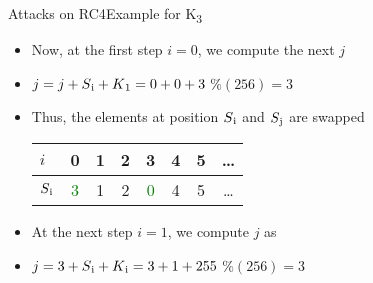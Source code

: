 \documentclass[
	aspectratio=169,	%
	onlytextwidth,		%
	t,					%
	]{beamer}
\begin{document}
\begin{frame}[fragile]{Attacks on RC4}{Example for K\textsubscript{3}}
	\begin{itemize}
		\item Now, at the first step $i=0$, we compute the next $j$
		\item $j = j + S\textsubscript{i} + K\textsubscript{1} = 0 + 0 + 3$ $\% (256) = 3$
		\item Thus, the elements at position $S\textsubscript{i}$ and $S\textsubscript{j}$ are swapped
		\medskip
		\begin{table}[h!]
			\begin{center}
			  \begin{tabular}{l|c|c|c|c|c|c|c}
				$i$ & 0 & 1 & 2 & 3 & 4 & 5 & \dots\\
				\hline
				$S\textsubscript{i}$ & \textcolor{green}{3} & 1 & 2 & \textcolor{green}{0} & 4 & 5 & \dots\\
			  \end{tabular}
			\end{center}
		  \end{table}
		\item At the next step $i = 1$, we compute $j$ as
		\item $j = 3 + S\textsubscript{i} + K\textsubscript{i} = 3 + 1 + 255$ $\% (256) = 3$
	\end{itemize}
\end{frame}
\end{document}
